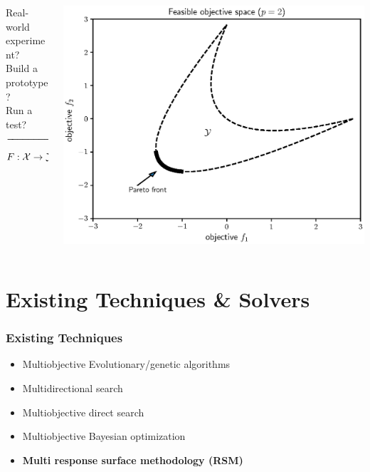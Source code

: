 \documentclass[aspectratio=169]{beamer}
\begin{document}
\begin{frame}
{\begin{columns}
\begin{column}{.2\textwidth}
\begin{center}
{{Real-world experiment?\\
Build a prototype?\\
Run a test?\\
}}
$\xrightarrow{\hspace*{2cm}}$
$$
F : {\cal X} \rightarrow {\cal Y}
$$
\end{center}
\end{column}
\begin{column}{.35\textwidth}
\includegraphics[width=\textwidth]{convex_pareto.eps}
\end{column}
\end{columns}
}
\end{frame}

\section{Existing Techniques \& Solvers}

\begin{frame}\frametitle{Existing Techniques}
\begin{itemize}
\item Multiobjective Evolutionary/genetic algorithms
\item Multidirectional search
\item Multiobjective direct search
\item Multiobjective Bayesian optimization
\pause
\item {\bf Multi response surface methodology (RSM)}
\end{itemize}
\end{frame}
\end{document}
